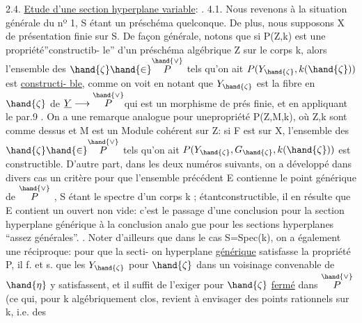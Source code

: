 2.4. \uline{Etude d'une section hyperplane variable}:  .
4.1.
Nous revenons à la situation générale du nº 1, S étant un préschéma
quelconque. De plus, nous supposons X de présentation finie sur S.
De façon générale, notons que si P(Z,k) est une propriété''constructib-%
le''  d'un préschéma algébrique Z sur le corps k,
alors l'ensemble des $\hand{\zeta} \hand{\in} \overset{\hand{\vee}}{P}$ tels qu'on ait $P(Y_{\hand{\zeta}},k(\hand{\zeta}))$ est \uline{constructi-%
ble}, comme on voit en notant que $Y_{\hand{\zeta}}$ est la fibre en $\hand{\zeta}$ de $\underline{Y} \longrightarrow \overset{\hand{\vee}}{P}$\hand{,}qui
est un morphisme de prés finie, et en appliquant le par.9 . On a une
remarque analogue pour une\hand{|}propriété P(Z,M,k), où Z,k sont comme dessus
et M est un Module cohérent sur Z: si F est  sur X, l'ensemble
des $\hand{\zeta} \hand{\in} \overset{\hand{\vee}}{P}$ tels qu'on ait $P(Y_{\hand{\zeta}},G_{\hand{\zeta}},k(\hand{\zeta}))$ est constructible. D'autre
part, dans les deux numéros suivants, on a développé  dans divers
cas un critère pour que l'ensemble précédent E contienne le point
générique de $\overset{\hand{\vee}}{P}$ , S étant le spectre d'un corps k ; étantconstructible,
il en résulte que E contient un ouvert non vide: c'est le passage d'une
conclusion pour la section hyperplane générique à la conclusion analo
gue pour les sections hyperplanes ``assez générales''.  \hand{[}\hand{]}. Noter d'ailleurs que 
dans le cas S=Spec(k), on a également une réciproque: pour que la secti-%
on hyperplane \uline{générique} satisfasse la propriété P, il f. et s. que
les $Y_{\hand{\zeta}}$ pour $\hand{\zeta}$ dans un voisinage convenable de $\hand{\eta}$ y satisfassent, et il
suffit de l'exiger pour $\hand{\zeta}$ \uline{fermé} dans $\overset{\hand{\vee}}{P}$ (ce qui, pour k algébriquement
clos, revient à envisager des points rationnels sur k, i.e. des

